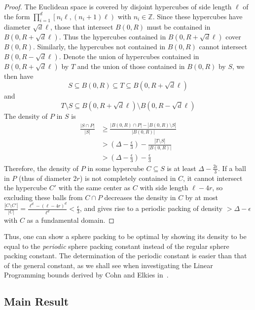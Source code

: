 \begin{proof}
  The Euclidean space is covered by disjoint hypercubes of side length $\ell$ of the form $\prod_{i=1}^d \left[ n_i\ell, (n_i+1)\ell \right)$ with $n_i \in \mathbb{Z}$. Since these hypercubes have diameter $\sqrt{d}\ell$, those that intersect $B(0,R)$ must be contained in $B(0,R+\sqrt{d}\ell)$. Thus the hypercubes contained in $B(0,R+\sqrt{d}\ell)$ cover $B(0,R)$. Similarly, the hypercubes not contained in $B(0,R)$ cannot intersect $B(0,R-\sqrt{d}\ell)$. Denote the union of hypercubes contained in $B(0,R+\sqrt{d}\ell)$ by $T$ and the union of those contained in $B(0,R)$ by $S$, we then have
  \[
    S \subseteq B(0,R) \subseteq T \subseteq B(0,R+\sqrt{d}\ell)
  \]
  and
  \[
    T \setminus S \subseteq B(0,R+\sqrt{d}\ell) \setminus B(0,R-\sqrt{d}\ell)
  \]
  The density of $P$ in $S$ is
  \[
    \begin{aligned}
      \frac{\left| S \cap P \right|}{\left| S \right|}
      &\ge \frac{\left| B(0,R) \cap P \right| - \left| B(0,R) \setminus S \right|}{\left| B(0,R) \right|} \\
      &> \left( \Delta - \frac{\epsilon}{3} \right) - \frac{\left| T \setminus S \right|}{\left| B(0,R) \right|} \\
      &> \left( \Delta - \frac{\epsilon}{3} \right) - \frac{\epsilon}{3}
    \end{aligned}
  \]
  Therefore, the density of $P$ in some hypercube $C \subseteq S$ is at least $\Delta - \frac{2\epsilon}{3}$. If a ball in $P$ (thus of diameter $2r$) is not completely contained in $C$, it cannot intersect the hypercube $C'$ with the same center as $C$ with side length $\ell-4r$, so excluding these balls from $C\cap P$ decreases the density in $C$ by at most $\frac{\left| C \setminus C' \right|}{\left| C \right|} = \frac{\ell^d - (\ell-4r)^d}{\ell^d} < \frac{\epsilon}{3}$, and gives rise to a periodic packing of density $> \Delta - \epsilon$ with $C$ as a fundamental domain.
\end{proof}

Thus, one can show a sphere packing to be optimal by showing its density to be equal to the \emph{periodic} sphere packing constant instead of the regular sphere packing constant. The determination of the periodic constant is easier than that of the general constant, as we shall see when investigating the Linear Programming bounds derived by Cohn and Elkies in~\cite{ElkiesCohn}.


\subsection{Main Result}

